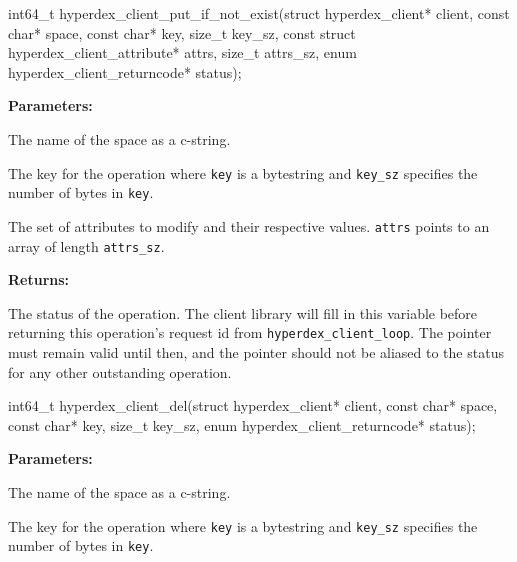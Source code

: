 \funcsep
\begin{ccode}
int64_t hyperdex_client_put_if_not_exist(struct hyperdex_client* client,
                const char* space,
                const char* key, size_t key_sz,
                const struct hyperdex_client_attribute* attrs, size_t attrs_sz,
                enum hyperdex_client_returncode* status);
\end{ccode}
\funcdesc 

\noindent\textbf{Parameters:}
\begin{description}[labelindent=\widthof{{\texttt{attrs}, \texttt{attrs\_sz}}},leftmargin=*,noitemsep,nolistsep,align=right]
\item[\texttt{space}] The name of the space as a c-string.
\item[\texttt{key}, \texttt{key\_sz}] The key for the operation where \texttt{key} is a bytestring and \texttt{key\_sz} specifies the number of bytes in \texttt{key}.
\item[\texttt{attrs}, \texttt{attrs\_sz}] The set of attributes to modify and their respective values.  \texttt{attrs} points to an array of length \texttt{attrs\_sz}.
\end{description}

\noindent\textbf{Returns:}
\begin{description}[labelindent=\widthof{{\texttt{status}}},leftmargin=*,noitemsep,nolistsep,align=right]
\item[\texttt{status}] The status of the operation.  The client library will fill in this variable before returning this operation's request id from \texttt{hyperdex\_client\_loop}.  The pointer must remain valid until then, and the pointer should not be aliased to the status for any other outstanding operation.
\end{description}

\funcsep
\begin{ccode}
int64_t hyperdex_client_del(struct hyperdex_client* client,
                const char* space,
                const char* key, size_t key_sz,
                enum hyperdex_client_returncode* status);
\end{ccode}
\funcdesc 

\noindent\textbf{Parameters:}
\begin{description}[labelindent=\widthof{{\texttt{key}, \texttt{key\_sz}}},leftmargin=*,noitemsep,nolistsep,align=right]
\item[\texttt{space}] The name of the space as a c-string.
\item[\texttt{key}, \texttt{key\_sz}] The key for the operation where \texttt{key} is a bytestring and \texttt{key\_sz} specifies the number of bytes in \texttt{key}.
\end{description}

